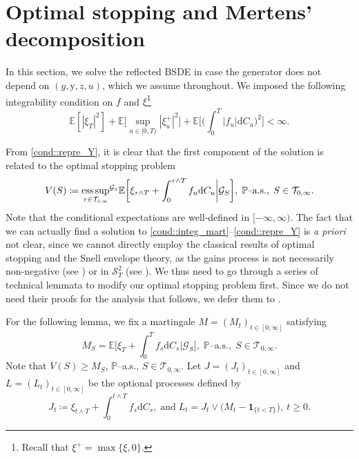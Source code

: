 \documentclass[10pt]{article} %
\newcommand\cG{\mathcal G}
\newcommand\cS{\mathcal S}
\newcommand\cT{\mathcal T}
\newcommand{\smalltext}[1]{\text{\fontsize{4}{4}\selectfont$#1$}}
\def \E{\mathbb{E}}
\def \P{\mathbb{P}}
\newcommand{\1}{\mathbf{1}}
\def\d{\mathrm{d}}
\DeclareMathOperator*{\esssup}{ess\,sup}
\begin{document}
\section{Optimal stopping and Mertens' decomposition}\label{sec::optimal_stopping}

In this section, we solve the reflected BSDE in case the generator does not depend on $(y,\mathrm{y},z,u)$, which we assume throughout. We imposed the following integrability condition on $f$ and $\xi$\footnote{Recall that $\xi^+ = \max\{\xi,0\}$.}
\begin{equation}\label{eq::integrability_optimal_stopping}
	\E[|\xi_T|^2] + \E\bigg[\sup_{u \in [0,T)}|\xi^+_u|^2\bigg] + \E\Bigg[\bigg(\int_0^T|f_u|\d C_u \bigg)^2\Bigg] < \infty.
\end{equation}

 From \ref{cond::repre_Y}, it is clear that the first component of the solution is related to the optimal stopping problem
\begin{equation}\label{eq::optimal_stopping}
	V(S) \coloneqq {\esssup_{\tau \in \cT_{\smalltext{S}\smalltext{,}\smalltext{\infty}}}}^{\cG_\smalltext{S}} \E \bigg[ \xi_{\tau \land T} + \int_0^{\tau \land T} f_u \d C_u \bigg| \cG_S \bigg], \; \text{$\P$--a.s.}, \; S \in \cT_{0,\infty}.
\end{equation}
Note that the conditional expectations are well-defined in $[-\infty,\infty)$. The fact that we can actually find a solution to \ref{cond::integ_mart}--\ref{cond::repre_Y} is \emph{a priori} not clear, since we cannot directly employ the classical results of optimal stopping and the Snell envelope theory, as the gains process is not necessarily non-negative (see \cite{el1981aspects,maingueneau1978temps}) or in $\cS^2_T$ (see \cite{grigorova2017reflected,grigorova2020optimal}). We thus need to go through a series of technical lemmata to modify our optimal stopping problem first. Since we do not need their proofs for the analysis that follows, we defer them to .

\medskip
For the following lemma, we fix a martingale $M= (M_t)_{t \in [0,\infty]}$ satisfying
	\begin{equation*}
		M_S = \E\bigg[\xi_T + \int_0^T f_s \d C_s\bigg|\cG_S\bigg], \; \text{$\P$--a.s.}, \; S \in \cT_{0,\infty}.
	\end{equation*}
	Note that $V(S) \geq M_S$, $\P$--a.s., $S \in \cT_{0,\infty}$. Let $J = (J_t)_{t \in [0,\infty]}$ and $L = (L_t)_{t \in [0,\infty]}$ be the optional processes defined by
	\begin{equation*}
		J_t \coloneqq \xi_{t \land T} + \int_0^{t \land T} f_s \d C_s, \; \text{and} \; L_t = J_t \lor \big(M_t - \mathbf{1}_{\{t < T\}}\big),\ t\geq 0.
	\end{equation*}
\end{document}

